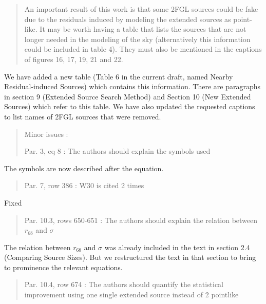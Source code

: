 \documentclass{article}
\newenvironment{referee}
{\begin{quote}\color{red}}
  {\end{quote}}
\newenvironment{reply}
  {}
  {}
\begin{document}
\begin{referee}
An important result of this work is that some 2FGL sources could be fake due to the residuals induced by modeling the extended sources as point-like. It may be worth having a table that lists the sources that are not longer needed in the modeling of the sky (alternatively this information could be included in table 4). They must also be mentioned in the captions of figures 16, 17, 19, 21 and 22.
\end{referee}


\begin{reply}
We have added a new table (Table 6 in the current draft, named Nearby Residual-induced Sources) which contains
this information. There are paragraphs in section 9 (Extended Source
Search Method) and Section 10 (New Extended Sources) which refer to this
table. We have also updated the requested captions to list names of 2FGL
sources that were removed.
\end{reply}


\begin{referee}
Minor issues :

Par. 3, eq 8 : The authors should explain the symbols used
\end{referee}


\begin{reply}
The symbols are now described after the equation.
\end{reply}


\begin{referee}
Par. 7, row 386 : W30 is cited 2 times
\end{referee}


\begin{reply}
Fixed
\end{reply}

\begin{referee}
  Par. 10.3, rows 650-651 : The authors should explain the relation between $r_{68}$ and $\sigma$
\end{referee}

\begin{reply}
  The relation between $r_{68}$ and $\sigma$ was already included in the text
in section 2.4 (Comparing Source Sizes). But we restructured the
text in that section to bring to prominence the relevant equations.
\end{reply}

\begin{referee}
Par. 10.4, row 674 : The authors should quantify the statistical
improvement using one single extended source instead of 2 pointlike
\end{referee}
\end{document}
